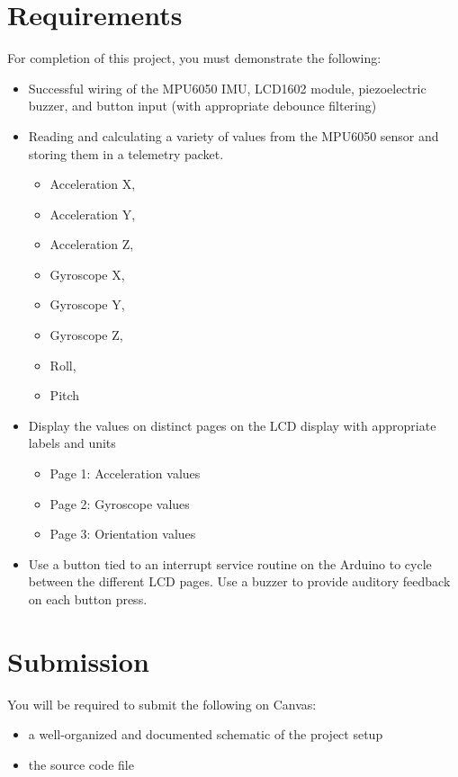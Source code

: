 \section*{Requirements} 
For completion of this project, you must demonstrate the following:
\begin{itemize}
    \item Successful wiring of the MPU6050 IMU, LCD1602 module, piezoelectric buzzer, and button input (with appropriate debounce filtering)
    \item Reading and calculating a variety of values from the MPU6050 sensor and storing them in a telemetry packet.
        \begin{itemize}
            \item Acceleration X,
            \item Acceleration Y,
            \item Acceleration Z,
            \item Gyroscope X,
            \item Gyroscope Y,
            \item Gyroscope Z,
            \item Roll,
            \item Pitch
        \end{itemize}    
    \item Display the values on distinct pages on the LCD display with appropriate labels and units
        \begin{itemize}
            \item Page 1: Acceleration values
            \item Page 2: Gyroscope values
            \item Page 3: Orientation values
        \end{itemize}
    \item Use a button tied to an interrupt service routine on the Arduino to cycle between the different LCD pages. Use a buzzer to provide auditory feedback on each button press.
\end{itemize}

\section*{Submission}
You will be required to submit the following on Canvas:
\begin{itemize}
    \item a well-organized and documented schematic of the project setup
    \item the source code file
\end{itemize}

